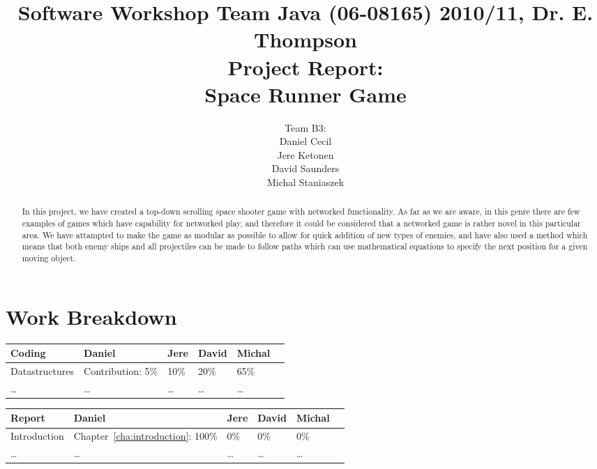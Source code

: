 \documentclass[10pt]{report}
\title{%
{\normalsize Software Workshop Team Java (06-08165) 2010/11, Dr. E. Thompson}\\[2cm]
Project Report:\\
Space Runner Game}
\author{Team B3:\\
Daniel Cecil\\
Jere Ketonen\\
David Saunders\\
Michal Staniaszek
}
\begin{document}
\maketitle
\tableofcontents
\chapter*{Work Breakdown}
\label{work-breakdown}

\thispagestyle{empty}

{\small

\noindent\begin{tabular}{|l||l|l|l|l|l|}\hline
  \textbf{Coding} & \textbf{Daniel} & \textbf{Jere} & \textbf{David}
 & \textbf{Michal} \\\hline\hline
 Datastructures & Contribution: 5\% & 10\% & 20\% & 65\%\\\hline
 \ldots & \ldots & \ldots & \ldots & \ldots \\\hline
\end{tabular}\vspace*{1cm}

\noindent\begin{tabular}{|l||l|l|l|l|l|}\hline
  \textbf{Report} & \textbf{Daniel} & \textbf{Jere} & \textbf{David}
 & \textbf{Michal}\\\hline\hline
 Introduction & Chapter~\ref{cha:introduction}: 100\% & 0\% & 0\% & 0\%\\\hline
 \ldots & \ldots & \ldots & \ldots & \ldots \\\hline
\end{tabular}

}     %

\tableofcontents
\thispagestyle{empty}

\begin{abstract}
In this project, we have created a top-down scrolling space shooter game with networked functionality. As far as we are aware, in this genre there are few examples of games which have capability for networked play, and therefore it could be considered that a networked game is rather novel in this particular area. We have attampted to make the game as modular as possible to allow for quick addition of new types of enemies, and have also used a method which means that both enemy ships and all projectiles can be made to follow paths which can use mathematical equations to specify the next position for a given moving object.
\end{abstract}




\appendix



\end{document}
